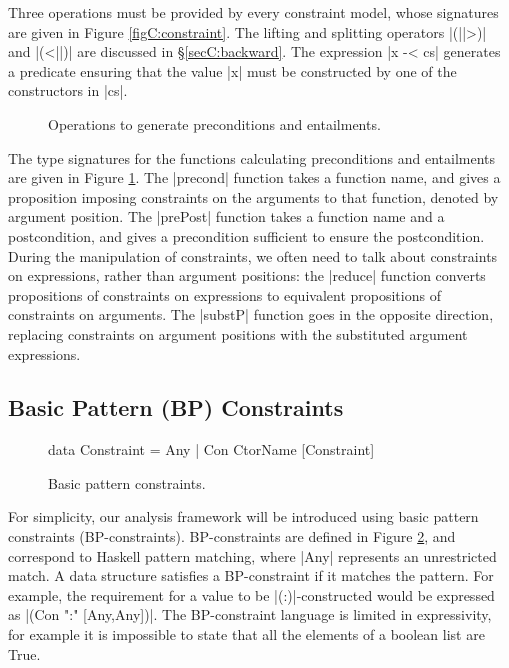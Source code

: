 Three operations must be provided by every constraint model, whose signatures are given in Figure \ref{figC:constraint}. The lifting and splitting operators |(||>)| and |(<||)| are discussed in \S\ref{secC:backward}. The expression |x -< cs| generates a predicate ensuring that the value |x| must be constructed by one of the constructors in |cs|.

\begin{figure}
\caption{Operations to generate preconditions and entailments.}
\label{figC:operations}
\end{figure}

The type signatures for the functions calculating preconditions and entailments are given in Figure \ref{figC:operations}. The |precond| function takes a function name, and gives a proposition imposing constraints on the arguments to that function, denoted by argument position. The |prePost| function takes a function name and a postcondition, and gives a precondition sufficient to ensure the postcondition. During the manipulation of constraints, we often need to talk about constraints on expressions, rather than argument positions: the |reduce| function converts propositions of constraints on expressions to equivalent propositions of constraints on arguments. The |substP| function goes in the opposite direction, replacing constraints on argument positions with the substituted argument expressions.

\subsection{Basic Pattern (BP) Constraints}
\label{secC:basic}

\begin{figure}
\begin{code}
data Constraint  =  Any
                 |  Con CtorName [Constraint]
\end{code}
\caption{Basic pattern constraints.}
\label{figC:basic}
\end{figure}

For simplicity, our analysis framework will be introduced using basic pattern constraints (BP-constraints). BP-constraints are defined in Figure \ref{figC:basic}, and correspond to Haskell pattern matching, where |Any| represents an unrestricted match. A data structure satisfies a BP-constraint if it matches the pattern. For example, the requirement for a value to be |(:)|-constructed would be expressed as |(Con ":" [Any,Any])|. The BP-constraint language is limited in expressivity, for example it is impossible to state that all the elements of a boolean list are True.

